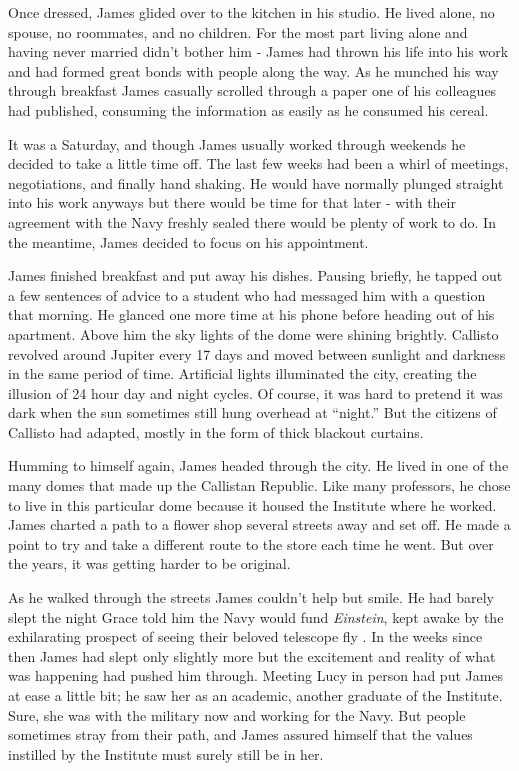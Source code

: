 \documentclass[openany, 12pt]{book} %
\begin{document}
Once dressed, James glided over to the kitchen in his studio. He lived alone, no spouse, no roommates, and no children. For the most part living alone and having never married didn't bother him - James had thrown his life into his work and had formed great bonds with people along the way. As he munched his way through breakfast James casually scrolled through a paper one of his colleagues had published, consuming the information as easily as he consumed his cereal.

It was a Saturday, and though James usually worked through weekends he decided to take a little time off. The last few weeks had been a whirl of meetings, negotiations, and finally hand shaking. He would have normally plunged straight into his work anyways but there would be time for that later - with their agreement with the Navy freshly sealed there would be plenty of work to do. In the meantime, James decided to focus on his appointment.

James finished breakfast and put away his dishes. Pausing briefly, he tapped out a few sentences of advice to a student who had messaged him with a question that morning. He glanced one more time at his phone before heading out of his apartment. Above him the sky lights of the dome were shining brightly. Callisto revolved around Jupiter every 17 days and moved between sunlight and darkness in the same period of time. Artificial lights illuminated the city, creating the illusion of 24 hour day and night cycles. Of course, it was hard to pretend it was dark when the sun sometimes still hung overhead at ``night.'' But the citizens of Callisto had adapted, mostly in the form of thick blackout curtains.

Humming to himself again, James headed through the city. He lived in one of the many domes that made up the Callistan Republic. Like many professors, he chose to live in this particular dome because it housed the Institute where he worked. James charted a path to a flower shop several streets away and set off. He made a point to try and take a different route to the store each time he went. But over the years, it was getting harder to be original.

As he walked through the streets James couldn't help but smile. He had barely slept the night Grace told him the Navy would fund \textit{Einstein}, kept awake by the exhilarating prospect of seeing their beloved telescope fly . In the weeks since then James had slept only slightly more but the excitement and reality of what was happening had pushed him through. Meeting Lucy in person had put James at ease a little bit; he saw her as an academic, another graduate of the Institute. Sure, she was with the military now and working for the Navy. But people sometimes stray from their path, and James assured himself that the values instilled by the Institute must surely still be in her.
\end{document}
